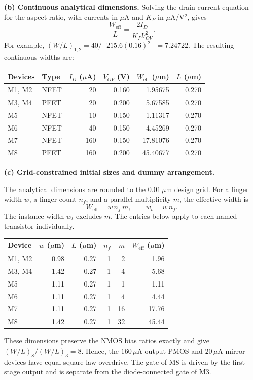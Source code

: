 \documentclass[12pt,letterpaper]{article}
\newcommand{\um}{\,\mu\mathrm{m}}
\newcommand{\uA}{\,\mu\mathrm{A}}
\begin{document}
\begin{enumerate}
\textbf{(b) Continuous analytical dimensions.}
Solving the drain-current equation for the aspect ratio, with
currents in $\mu$A and $K_P$ in $\mu$A/V$^2$, gives
\[
\frac{W_{\mathrm{eff}}}{L}=\frac{2I_D}{K_PV_{OV}^2}.
\]
For example, $(W/L)_{1,2}=40/[215.6(0.16)^2]=7.24722$.
The resulting continuous widths are:
\begin{center}
\small
\setlength{\tabcolsep}{5pt}
\begin{tabular}{@{}llrrrr@{}}
\toprule
Devices & Type & $I_D$ ($\mu$A) & $V_{OV}$ (V) &
 $W_{\mathrm{eff}}$ ($\mu$m) & $L$ ($\mu$m)\\
\midrule
M1, M2 & NFET & 20 & 0.160 & 1.95675 & 0.270\\
M3, M4 & PFET & 20 & 0.200 & 5.67585 & 0.270\\
M5 & NFET & 10 & 0.150 & 1.11317 & 0.270\\
M6 & NFET & 40 & 0.150 & 4.45269 & 0.270\\
M7 & NFET & 160 & 0.150 & 17.81076 & 0.270\\
M8 & PFET & 160 & 0.200 & 45.40677 & 0.270\\
\bottomrule
\end{tabular}
\end{center}

\newpage
\textbf{(c) Grid-constrained initial sizes and dummy arrangement.}

The analytical dimensions are rounded to the $0.01\um$ design grid.
For a finger width $w$, a finger count $n_f$, and a parallel
multiplicity $m$, the effective width is
\[
W_{\mathrm{eff}}=w\,n_f\,m,\qquad w_t=w\,n_f.
\]
The instance width $w_t$ excludes $m$. The entries below apply to
each named transistor individually.
\begin{center}
\small
\setlength{\tabcolsep}{7pt}
\begin{tabular}{@{}lrrrrr@{}}
\toprule
Device & $w$ ($\mu$m) & $L$ ($\mu$m) & $n_f$ & $m$ &
 $W_{\mathrm{eff}}$ ($\mu$m)\\
\midrule
M1, M2 & 0.98 & 0.27 & 1 & 2 & 1.96\\
M3, M4 & 1.42 & 0.27 & 1 & 4 & 5.68\\
M5 & 1.11 & 0.27 & 1 & 1 & 1.11\\
M6 & 1.11 & 0.27 & 1 & 4 & 4.44\\
M7 & 1.11 & 0.27 & 1 & 16 & 17.76\\
M8 & 1.42 & 0.27 & 1 & 32 & 45.44\\
\bottomrule
\end{tabular}
\end{center}
These dimensions preserve the NMOS bias ratios exactly and give
$(W/L)_8/(W/L)_3=8$. Hence, the $160\uA$ output PMOS and
$20\uA$ mirror devices have equal square-law overdrive.
The gate of M8 is driven by the first-stage output and is separate
from the diode-connected gate of M3.


\end{enumerate}
\end{document}
